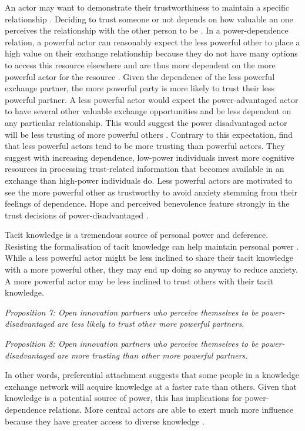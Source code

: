 An actor may want to demonstrate their trustworthiness to maintain a specific relationship \citep{schilke2015power}. Deciding to trust someone or not depends on how valuable an one perceives the relationship with the other person to be \citep{axelrod1984evolution}. In a power-dependence relation, a powerful actor can reasonably expect the less powerful other to place a high value on their exchange relationship because they do not have many options to access this resource elsewhere and are thus more dependent on the more powerful actor for the resource \citep{emerson1962power}. Given the dependence of the less powerful exchange partner, the more powerful party is more likely to trust their less powerful partner. A less powerful actor would expect the power-advantaged actor to have several other valuable exchange opportunities and be less dependent on any particular relationship. This would suggest the power disadvantaged actor will be less trusting of more powerful others \citep{schilke2015power}. Contrary to this expectation, \citet{schilke2015power} find that less powerful actors tend to be more trusting than powerful actors. They suggest with increasing dependence, low-power individuals invest more cognitive resources in processing trust-related information that becomes available in an exchange than high-power individuals do. Less powerful actors are motivated to see the more powerful other as trustworthy to avoid anxiety stemming from their feelings of dependence. Hope and perceived benevolence feature strongly in the trust decisions of power-disadvantaged \citep{schilke2015power}. \medskip

Tacit knowledge is a tremendous source of personal power and deference. Resisting the formalisation of tacit knowledge can help maintain personal power \citep{schultze2004knowing}. While a less powerful actor might be less inclined to share their tacit knowledge with a more powerful other, they may end up doing so anyway to reduce anxiety. A more powerful actor may be less inclined to trust others with their tacit knowledge. \medskip

\emph{Proposition 7: Open innovation partners who perceive themselves to be power-disadvantaged are less likely to trust other more powerful partners.}

\emph{Proposition 8: Open innovation partners who perceive themselves to be power-disadvantaged are more trusting than other more powerful partners.}

In other words, preferential attachment suggests that some people in a knowledge exchange network will acquire knowledge at a faster rate than others. Given that knowledge is a potential source of power, this has implications for power-dependence relations. More central actors are able to exert much more influence because they have greater access to diverse knowledge \citep{emerson1962power,bonacich1987power}. 

